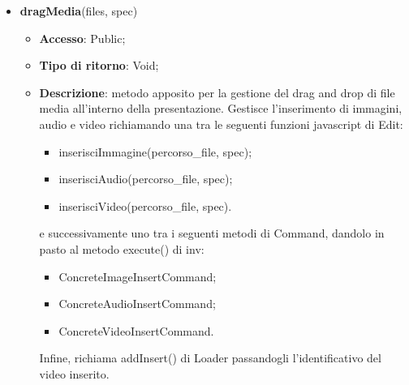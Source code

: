 {{\begin{itemize}
			\begin{itemize}
				\item \textbf{Accesso}: Public;
				\item \textbf{Tipo di ritorno}: Void;
				\item \textbf{Descrizione}: metodo che prima richiama isVideo(frames) di Upload per controllare che le estensioni siano corrette, successivamente uploadmedia(files, callback) di Upload per il caricamento dei file video nel server. Se l'operazione ha successo, viene invocato callback() il quale inserisce ogni video nel piano della presentazione, attraverso la funzione javascript inserisciVideo(percorso\_file, spec) di Edit, e richiama, utilizzando il metodo execute di inv, ConcreteVideoInsertCommand() di Command passandogli le specifiche degli elementi video inseriti. Infine, richiama addInsert() di Loader passandogli l'identificativo del video inserito. Nel caso in cui il parametro spec sia definito, significa che è stata inviata una richiesta di undo/redo da Command, per cui, il metodo si occuperà solamente di aggiornare la view.
			\end{itemize}
			\item \textbf{dragMedia}(files, spec)
			\begin{itemize}
				\item \textbf{Accesso}: Public;
				\item \textbf{Tipo di ritorno}: Void;
				\item \textbf{Descrizione}: metodo apposito per la gestione del drag and drop di file media all'interno della presentazione. Gestisce l'inserimento di immagini, audio e video richiamando una tra le seguenti funzioni javascript di Edit:
				\begin{itemize}
					\item inserisciImmagine(percorso\_file, spec);
					\item inserisciAudio(percorso\_file, spec);
					\item inserisciVideo(percorso\_file, spec).
				\end{itemize}
				 e successivamente uno tra i seguenti metodi di Command, dandolo in pasto al metodo execute() di inv:
				\begin{itemize}
					\item ConcreteImageInsertCommand;
					\item ConcreteAudioInsertCommand;
					\item ConcreteVideoInsertCommand.
				\end{itemize}
				Infine, richiama addInsert() di Loader passandogli l'identificativo del video inserito.

\end{itemize}
\end{itemize}}}
